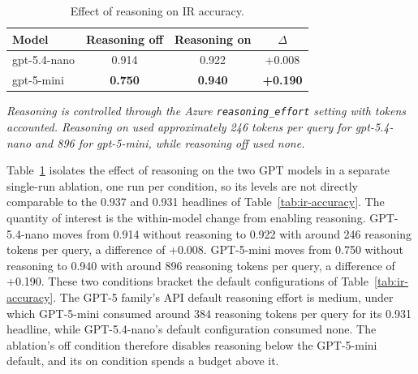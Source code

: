 \begin{table}[t]
\caption{Effect of reasoning on IR accuracy.}
\label{tab:ir-reasoning}
\centering
\footnotesize
\begin{tabular}{@{}lccc@{}}
\toprule
Model & Reasoning off & Reasoning on & $\Delta$ \\
\midrule
gpt-5.4-nano & 0.914 & 0.922 & +0.008 \\
gpt-5-mini & \textbf{0.750} & \textbf{0.940} & \textbf{+0.190} \\
\bottomrule
\end{tabular}

\vspace{3pt}
\begin{minipage}{\linewidth}
\footnotesize\itshape
Reasoning is controlled through the Azure \texttt{reasoning\_effort} setting with tokens accounted. Reasoning on used approximately 246 tokens per query for gpt-5.4-nano and 896 for gpt-5-mini, while reasoning off used none.
\end{minipage}
\end{table}

Table~\ref{tab:ir-reasoning} isolates the effect of reasoning on the two GPT models in a separate single-run ablation, one run per condition, so its levels are not directly comparable to the 0.937 and 0.931 headlines of Table~\ref{tab:ir-accuracy}. The quantity of interest is the within-model change from enabling reasoning. GPT-5.4-nano moves from 0.914 without reasoning to 0.922 with around 246 reasoning tokens per query, a difference of +0.008. GPT-5-mini moves from 0.750 without reasoning to 0.940 with around 896 reasoning tokens per query, a difference of +0.190. These two conditions bracket the default configurations of Table~\ref{tab:ir-accuracy}. The GPT-5 family's API default reasoning effort is medium, under which GPT-5-mini consumed around 384 reasoning tokens per query for its 0.931 headline, while GPT-5.4-nano's default configuration consumed none. The ablation's off condition therefore disables reasoning below the GPT-5-mini default, and its on condition spends a budget above it.

